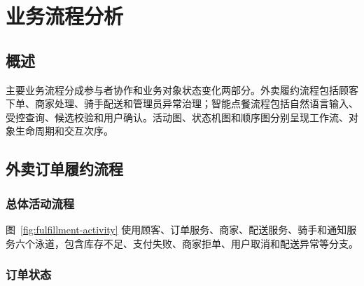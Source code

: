 \section{业务流程分析}

\subsection{概述}

主要业务流程分成参与者协作和业务对象状态变化两部分。外卖履约流程包括顾客下单、商家处理、骑手配送和管理员异常治理；智能点餐流程包括自然语言输入、受控查询、候选校验和用户确认。活动图、状态机图和顺序图分别呈现工作流、对象生命周期和交互次序。

\subsection{外卖订单履约流程}

\subsubsection{总体活动流程}


图~\ref{fig:fulfillment-activity} 使用顾客、订单服务、商家、配送服务、骑手和通知服务六个泳道，包含库存不足、支付失败、商家拒单、用户取消和配送异常等分支。

\subsubsection{订单状态}


